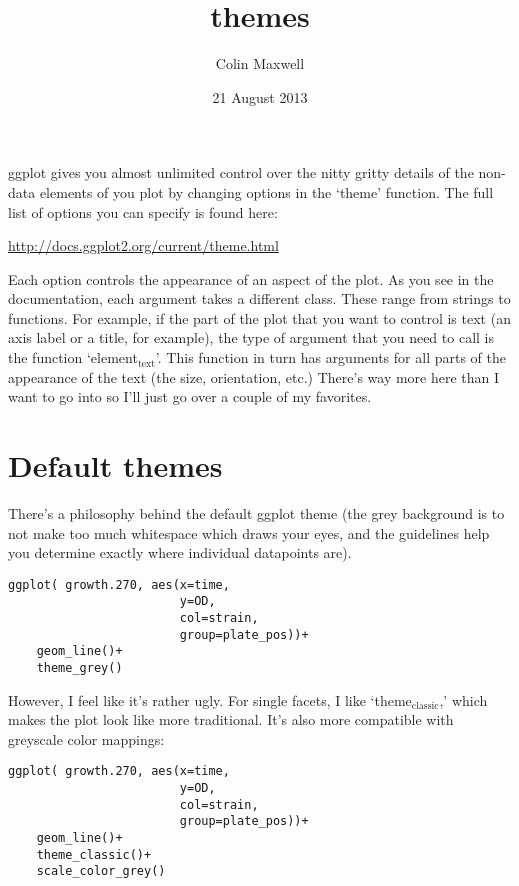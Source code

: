 \documentclass[11pt]{article}
\title{themes}
\author{Colin Maxwell}
\date{21 August 2013}
\begin{document}
\maketitle

\setcounter{tocdepth}{3}
\tableofcontents
\vspace*{1cm}

ggplot gives you almost unlimited control over the nitty gritty
details of the non-data elements of you plot by changing options in the
`theme' function. The full list of options you can specify is found here:

\href{http://docs.ggplot2.org/current/theme.html}{http://docs.ggplot2.org/current/theme.html}

Each option controls the appearance of an aspect of the plot. As you see in the documentation, each argument takes a different
class. These range from strings to functions. For example, if the part
of the plot that you want to control is text (an axis label or a
title, for example), the type of argument that you need to call is the
function `element$_{\mathrm{text}}$'. This function in turn has arguments for all
parts of the appearance of the text (the size, orientation, etc.)
There's way more here than I want to go into so I'll just go over a couple of my favorites.

\section{Default themes}
\label{sec-1}


There's a philosophy behind the default ggplot theme (the grey
background is to not make too much whitespace which draws your eyes,
and the guidelines help you determine exactly where individual
datapoints are). 

\begin{verbatim}
ggplot( growth.270, aes(x=time,
                        y=OD,
                        col=strain,
                        group=plate_pos))+
    geom_line()+
    theme_grey()
\end{verbatim}


However, I feel like it's rather ugly. For single
facets, I like `theme$_{\mathrm{classic}}$,' which makes the plot look like more
traditional. It's also more compatible with greyscale color mappings:

\begin{verbatim}
ggplot( growth.270, aes(x=time,
                        y=OD,
                        col=strain,
                        group=plate_pos))+
    geom_line()+
    theme_classic()+
    scale_color_grey()
\end{verbatim}
\end{document}
